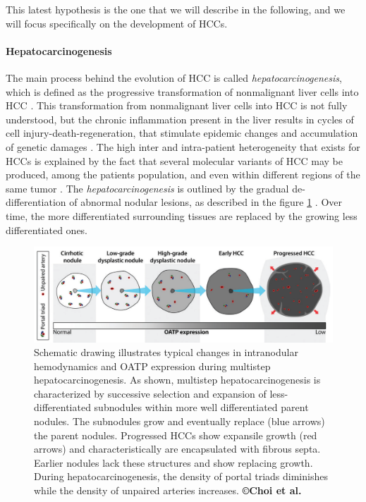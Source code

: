 \documentclass[]{article}
\let\oldparagraph\paragraph
\renewcommand{\paragraph}[1]{\oldparagraph{#1}\mbox{}}
\begin{document}
This latest hypothesis is the one that we will describe in the
following, and we will focus specifically on the development of
HCCs.

\paragraph{Hepatocarcinogenesis}\label{hepatocarcinogenesis}

The main process behind the evolution of HCC is called
\emph{hepatocarcinogenesis}, which is
defined as the progressive transformation of nonmalignant liver cells
into HCC \cite{Choi2014}. 
This transformation from nonmalignant liver cells into HCC is not
fully understood, but the chronic inflammation present in the liver
results in cycles of cell injury-death-regeneration, that stimulate
epidemic changes and accumulation of genetic damages \cite{Thorgeirsson2002,Aravalli2013,Brody2012,Trevisani2008a}. 
The high inter and intra-patient heterogeneity that exists for
HCCs is explained by the fact that several molecular variants of
HCC may be produced, among the patients population, and even
within different regions of the same tumor \cite{Trevisani2008a,Frenette2011}.
The \emph{hepatocarcinogenesis} is outlined by the gradual
de-differentiation of abnormal nodular lesions, as described in the
figure \ref{Choi2014_Fig1} \cite{Park2011,Frenette2011}. Over time, the more
differentiated surrounding tissues are replaced by the growing less
differentiated ones.

\begin{figure}[ht!]
\centering
\includegraphics[width=0.7\linewidth]{images/image4}
\caption{Schematic drawing illustrates typical changes in intranodular hemodynamics and OATP expression during multistep hepatocarcinogenesis. As shown, multistep hepatocarcinogenesis is characterized by successive selection and expansion of less-differentiated subnodules within more well differentiated parent nodules. The subnodules grow and eventually replace (blue arrows) the parent nodules. Progressed HCCs show expansile growth (red arrows) and characteristically are encapsulated with fibrous septa. Earlier nodules lack these structures and show replacing growth. During hepatocarcinogenesis, the density of portal triads diminishes while the density of unpaired arteries increases. \textbf{©Choi et al. \cite{Choi2014}}}
\label{Choi2014_Fig1}
\end{figure}
\end{document}
